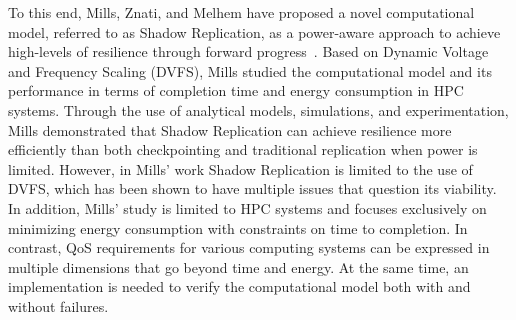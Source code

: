 To this end, Mills, Znati, and Melhem have proposed a novel computational model, referred to as Shadow Replication, as a  
power-aware approach to achieve high-levels of resilience through forward progress~\cite{mills_2014_icnc,mills_2014_pdp,mills2014power}. Based on Dynamic Voltage and Frequency Scaling (DVFS), Mills studied the computational model and its performance in terms of completion time and energy consumption in HPC systems. Through the use of analytical models, simulations, and experimentation, Mills demonstrated that Shadow Replication can achieve resilience more efficiently than both checkpointing and traditional replication when power is limited. However, in Mills' work Shadow Replication is limited to the use of DVFS, which has been shown to have multiple issues that question its viability. In addition, Mills' study is limited to HPC systems and focuses exclusively on minimizing energy consumption with constraints on time to completion. In contrast, QoS requirements for various computing systems can be expressed in multiple dimensions that go beyond time and energy. At the same time, an implementation is needed to verify the computational model both with and without failures. 



